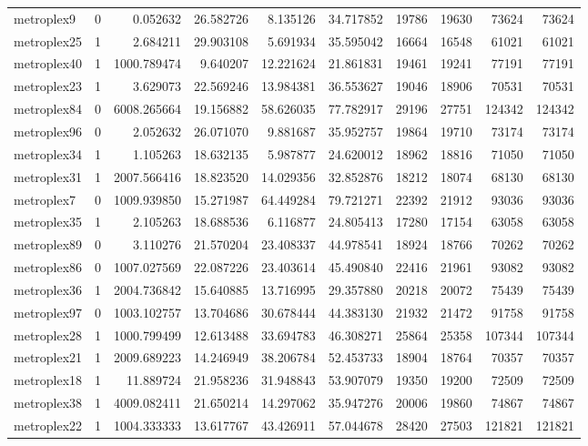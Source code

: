 \begin{longtable}{|l|r|r|r|r|r|r|r|r|r|}
metroplex9 & 0 & 0.052632 & 26.582726 & 8.135126 & 34.717852 & 19786 & 19630 & 73624 & 73624 \\
metroplex25 & 1 & 2.684211 & 29.903108 & 5.691934 & 35.595042 & 16664 & 16548 & 61021 & 61021 \\
metroplex40 & 1 & 1000.789474 & 9.640207 & 12.221624 & 21.861831 & 19461 & 19241 & 77191 & 77191 \\
metroplex23 & 1 & 3.629073 & 22.569246 & 13.984381 & 36.553627 & 19046 & 18906 & 70531 & 70531 \\
metroplex84 & 0 & 6008.265664 & 19.156882 & 58.626035 & 77.782917 & 29196 & 27751 & 124342 & 124342 \\
metroplex96 & 0 & 2.052632 & 26.071070 & 9.881687 & 35.952757 & 19864 & 19710 & 73174 & 73174 \\
metroplex34 & 1 & 1.105263 & 18.632135 & 5.987877 & 24.620012 & 18962 & 18816 & 71050 & 71050 \\
metroplex31 & 1 & 2007.566416 & 18.823520 & 14.029356 & 32.852876 & 18212 & 18074 & 68130 & 68130 \\
metroplex7 & 0 & 1009.939850 & 15.271987 & 64.449284 & 79.721271 & 22392 & 21912 & 93036 & 93036 \\
metroplex35 & 1 & 2.105263 & 18.688536 & 6.116877 & 24.805413 & 17280 & 17154 & 63058 & 63058 \\
metroplex89 & 0 & 3.110276 & 21.570204 & 23.408337 & 44.978541 & 18924 & 18766 & 70262 & 70262 \\
metroplex86 & 0 & 1007.027569 & 22.087226 & 23.403614 & 45.490840 & 22416 & 21961 & 93082 & 93082 \\
metroplex36 & 1 & 2004.736842 & 15.640885 & 13.716995 & 29.357880 & 20218 & 20072 & 75439 & 75439 \\
metroplex97 & 0 & 1003.102757 & 13.704686 & 30.678444 & 44.383130 & 21932 & 21472 & 91758 & 91758 \\
metroplex28 & 1 & 1000.799499 & 12.613488 & 33.694783 & 46.308271 & 25864 & 25358 & 107344 & 107344 \\
metroplex21 & 1 & 2009.689223 & 14.246949 & 38.206784 & 52.453733 & 18904 & 18764 & 70357 & 70357 \\
metroplex18 & 1 & 11.889724 & 21.958236 & 31.948843 & 53.907079 & 19350 & 19200 & 72509 & 72509 \\
metroplex38 & 1 & 4009.082411 & 21.650214 & 14.297062 & 35.947276 & 20006 & 19860 & 74867 & 74867 \\
metroplex22 & 1 & 1004.333333 & 13.617767 & 43.426911 & 57.044678 & 28420 & 27503 & 121821 & 121821 \\

\end{longtable}
